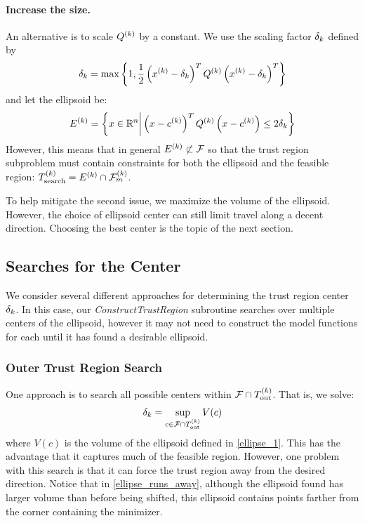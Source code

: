 \paragraph{Increase the size.}
An alternative is to scale ${Q^{(k)}}$ by a constant.
We use the scaling factor ${\delta_k}$ defined by
\begin{align*}
{\delta_k} = \max \left\{1, \frac 1 {2} \left(x^{(k)} - {\delta_k}\right)^T {Q^{(k)}} \left(x^{(k)} - {\delta_k}\right)^T \right\}
\end{align*}
and let the ellipsoid be:
\begin{align*}
{E^{(k)}} = \left\{x \in \mathbb R^n \bigg| \left(x - {c^{(k)}}\right)^T {Q^{(k)}} \left(x - {c^{(k)}}\right) \le 2{\delta_k}\right\}
\end{align*}
However, this means that in general ${E^{(k)}} \not \subset {\mathcal F}$ so that the trust region subproblem must contain constraints for both the ellipsoid and the feasible region: 
${T_{\text{search}}^{(k)}} = {E^{(k)}} \cap {\mathcal F_m^{(k)}}$.

To help mitigate the second issue, we maximize the volume of the ellipsoid.
However, the choice of ellipsoid center can still limit travel along a decent direction.
Choosing the best center is the topic of the next section.\


\subsection{Searches for the Center}

We consider several different approaches for determining the trust region center ${\delta_k}$.
In this case, our \emph{ConstructTrustRegion} subroutine searches over multiple centers of the ellipsoid, however it may not need to construct the model functions for each until it has found a desirable ellipsoid.


\subsubsection{Outer Trust Region Search}

One approach is to search all possible centers within $ {\mathcal F} \cap {T_{\text{out}}^{(k)}} $.
That is, we solve:
\begin{align*}
{\delta_k} = \sup_{c \in {\mathcal F} \cap {T_{\text{out}}^{(k)}}} V(c)
\end{align*}
where $V(c)$ is the volume of the ellipsoid defined in \cref{ellipse_1}.
This has the advantage that it captures much of the feasible region.
However, one problem with this search is that it can force the trust region away from the desired direction.
Notice that in \cref{ellipse_runs_away}, although the ellipsoid found has larger volume than before being shifted, this ellipsoid contains points farther from the corner containing the minimizer.

